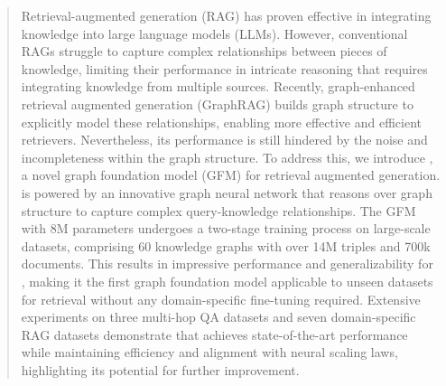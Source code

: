 \begin{abstract}
    Retrieval-augmented generation (RAG) has proven effective in integrating knowledge into large language models (LLMs). However, conventional RAGs struggle to capture complex relationships between pieces of knowledge, limiting their performance in intricate reasoning that requires integrating knowledge from multiple sources. Recently, graph-enhanced retrieval augmented generation (GraphRAG) builds graph structure to explicitly model these relationships, enabling more effective and efficient retrievers. Nevertheless, its performance is still hindered by the noise and incompleteness within the graph structure. To address this, we introduce \ourmethod, a novel graph foundation model (GFM) for retrieval augmented generation. \ourmethod is powered by an innovative graph neural network that reasons over graph structure to capture complex query-knowledge relationships. The GFM with 8M parameters undergoes a two-stage training process on large-scale datasets, comprising 60 knowledge graphs with over 14M triples and 700k documents. This results in impressive performance and generalizability for \ourmethod, making it the first graph foundation model applicable to unseen datasets for retrieval without any domain-specific fine-tuning required. Extensive experiments on three multi-hop QA datasets and seven domain-specific RAG datasets demonstrate that \ourmethod achieves state-of-the-art performance while maintaining efficiency and alignment with neural scaling laws, highlighting its potential for further improvement.
\end{abstract}

